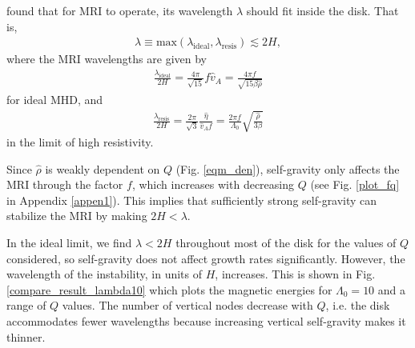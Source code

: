 \cite{sano99} found that for MRI to operate, its 
wavelength $\lambda$ should fit inside the disk. That is,   
\begin{align}\label{sano_crit}
  \lambda \equiv
  \mathrm{max}\left(\lambda_\mathrm{ideal},\lambda_\mathrm{resis}\right)\lesssim
  2H, 
\end{align}
where the MRI wavelengths are given by 
\begin{align}\label{lambda_ideal}
  \frac{\lambda_\mathrm{ideal}}{2H} = \frac{4\pi}{\sqrt{15}} f \hat{v}_A =
  \frac{4\pi f}{\sqrt{15\beta\hat{\rho}}}
\end{align}
for ideal MHD, and 
\begin{align}\label{lambda_resis}
  \frac{\lambda_\mathrm{resis}}{2H} = \frac{2\pi}{\sqrt{3}}\frac{\hat{\eta}}{\hat{v}_A f} =
  \frac{2\pi f}{\Lambda_0}\sqrt{\frac{\hat{\rho}}{3\beta}} 
\end{align}
in the limit of high resistivity.  
   
Since $\hat{\rho}$ is weakly dependent
on $Q$ (Fig. \ref{eqm_den}), self-gravity only affects the
MRI through the factor $f$, which increases with decreasing $Q$ (see
Fig. \ref{plot_fq} in Appendix \ref{appen1}).   
This implies that sufficiently strong self-gravity can stabilize the
MRI by making $ 2H<\lambda $.  %
 
In the ideal limit, we find $\lambda < 2H$ throughout most of the disk
for the values of $Q$ considered, so self-gravity does not affect
growth rates significantly. However, the wavelength of the
instability, in units of $H$, increases. This is shown in
Fig. \ref{compare_result_lambda10} which plots the magnetic energies
for $\Lambda_0=10$ and a range of $Q$ values. The number of vertical
nodes decrease with $Q$, i.e. the disk accommodates fewer wavelengths
because increasing vertical self-gravity makes it thinner. 





